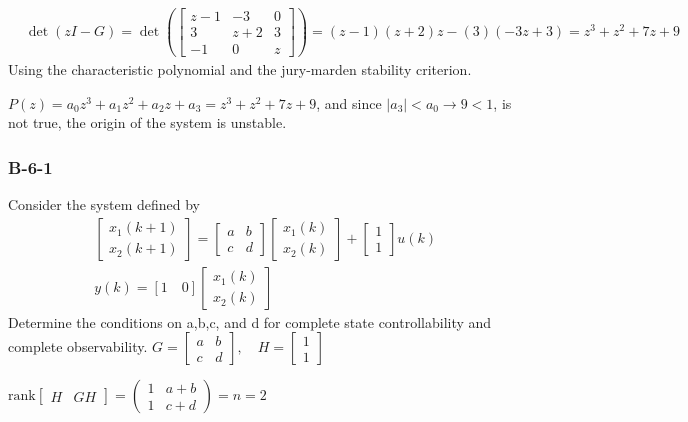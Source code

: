 \begin{align*}
& \det(zI-G) = \det \left(\begin{bmatrix}
z-1 &   -3 & 0  \\
3  & z+2 & 3 \\
-1   &  0  & z 
\end{bmatrix} \right) = (z-1)(z+2)z-(3)(-3z+3) = z^3+z^2+7z+9
\end{align*}
Using the characteristic polynomial and the jury-marden stability criterion.

$P(z)=a_0z^3+a_1z^2+a_2z+a_3=z^3+z^2+7z+9$, and since $|a_3| < a_0 \rightarrow 9 < 1$, is not true, the origin of the system is unstable.
\subsubsection*{B-6-1}
Consider the system defined by
\begin{align*}
& \begin{bmatrix}
x_1(k+1) \\
x_2(k+1)
\end{bmatrix}= \begin{bmatrix}
a  &  b  \\
c  &  d
\end{bmatrix}\begin{bmatrix}
x_1(k) \\
x_2(k)
\end{bmatrix}+\begin{bmatrix}
1 \\
1
\end{bmatrix}u(k) \\
& y(k) = [1 \quad 0] \begin{bmatrix}
x_1(k) \\
x_2(k)
\end{bmatrix}
\end{align*}
Determine the conditions on a,b,c, and d for complete state controllability and complete observability. $\displaystyle G = \begin{bmatrix} a & b\\ c & d \end{bmatrix}, \quad H =\begin{bmatrix} 1 \\ 1 \end{bmatrix}$

\noindent $\text{rank}\begin{bmatrix}
H & GH
\end{bmatrix}=\left(\begin{array}{cc} 1 & a+b\\ 1 & c+d \end{array}\right)=n=2$ \hfill \break 

